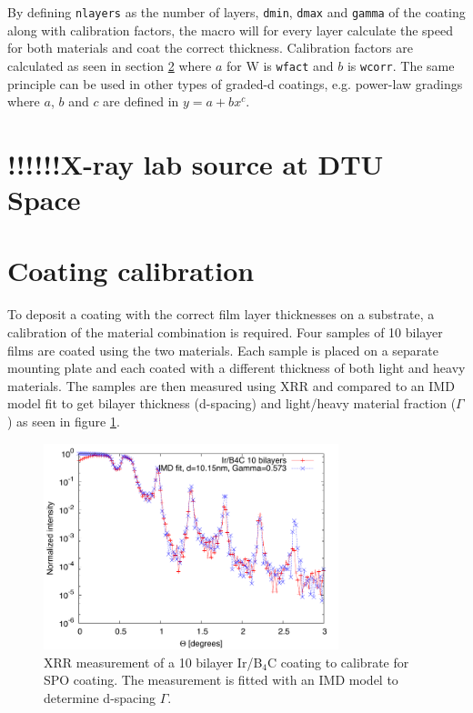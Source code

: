 By defining \verb|nlayers| as the number of layers, \verb|dmin|, \verb|dmax| and \verb|gamma| of the coating along with calibration factors, the macro will for every layer calculate the speed for both materials and coat the correct thickness. Calibration factors are calculated as seen in section \ref{sec:coating_calib} where $a$ for W is \verb|wfact| and $b$ is \verb|wcorr|. The same principle can be used in other types of graded-d coatings, e.g. power-law gradings where $a$, $b$ and $c$ are defined in $y = a+bx^c$.

\section{!!!!!!X-ray lab source at DTU Space}

\section{Coating calibration}\label{sec:coating_calib}
To deposit a coating with the correct film layer thicknesses on a substrate, a calibration of the material combination is required. Four samples of 10 bilayer films are coated using the two materials. Each sample is placed on a separate mounting plate and each coated with a different thickness of both light and heavy materials. The samples are then measured using XRR and compared to an IMD model fit to get bilayer thickness (d-spacing) and light/heavy material fraction ($\Gamma$) as seen in figure \ref{fig:irb4c-fit}.

\begin{figure}[!h]
  \center
  \includegraphics[height=6cm]{figures/chamber/si5811-fit.pdf}
\caption{\footnotesize XRR measurement of a 10 bilayer Ir/B$_4$C coating to calibrate for SPO coating. The measurement is fitted with an IMD model to determine d-spacing $\Gamma$.}\label{fig:irb4c-fit}
\end{figure}

